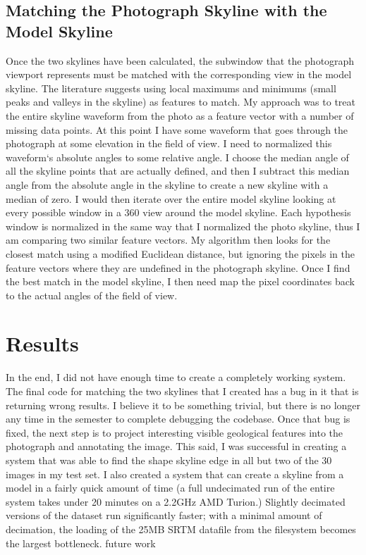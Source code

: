 \documentclass{acm_proc_article-sp}
\begin{document}
\subsection{Matching the Photograph Skyline with the Model Skyline}
    Once the two skylines have been calculated, the subwindow that the photograph viewport represents must be matched with the corresponding view in the model skyline.  The literature suggests using local maximums and minimums (small peaks and valleys in the skyline) as features to match. My approach was to treat the entire skyline  waveform from the photo as a feature vector with a number of missing data points. At this point I have some waveform that goes through the photograph at some elevation in the field of view.  I need to normalized this waveform`s absolute angles to some relative angle.  I choose the median angle of all the skyline points that are actually defined, and then I subtract this median angle from the absolute angle in the skyline to create a new skyline with a median of zero.  I would then iterate over the entire model skyline looking at every possible window in a 360 view around the model skyline.  Each hypothesis window is normalized in the same way that I normalized the photo skyline, thus I am comparing two similar feature vectors.  My algorithm then looks for the closest match using a modified Euclidean distance, but ignoring the pixels in the feature vectors where they are undefined in the photograph skyline.  Once I find the best match in the model skyline, I then need map the pixel coordinates back to the actual angles of the field of view.
\section{Results}
    In the end, I did not have enough time to create a completely working system.  The final code for matching the two skylines that I created has a bug in it that is returning wrong results.  I believe it to be something trivial, but there is no longer any time in the semester to complete debugging the codebase.  Once that bug is fixed, the next step is to project interesting visible geological features into the photograph and annotating the image.
    This said, I was successful in creating a system that was able to find the shape skyline edge in all but two of the 30 images in my test set.  I also created a system that can create a skyline from a model in a fairly quick amount of time (a full undecimated run of the entire system takes under 20 minutes on a 2.2GHz AMD Turion.)  Slightly decimated versions of the dataset run significantly faster; with a minimal amount of decimation, the loading of the 25MB SRTM datafile from the filesystem becomes the largest bottleneck.  
future work
\end{document}
